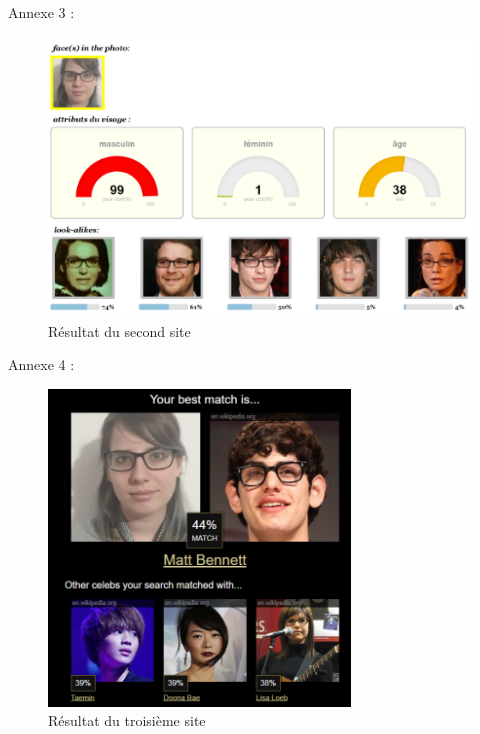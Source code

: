 \documentclass[a4paper,12pt]{article}
\begin{document}
  \newpage
Annexe 3 : 
\begin{figure}[!ht]
    \centering
        \includegraphics[scale=1]{images/ResS2.PNG}
        \caption{Résultat du second site}
    \end{figure} 
\newpage
Annexe 4 :
\begin{figure}[!ht]
    \centering
        \includegraphics[scale=1]{images/ResS3.PNG}
        \caption{Résultat du troisième site}
    \end{figure}




	


\end{document}
